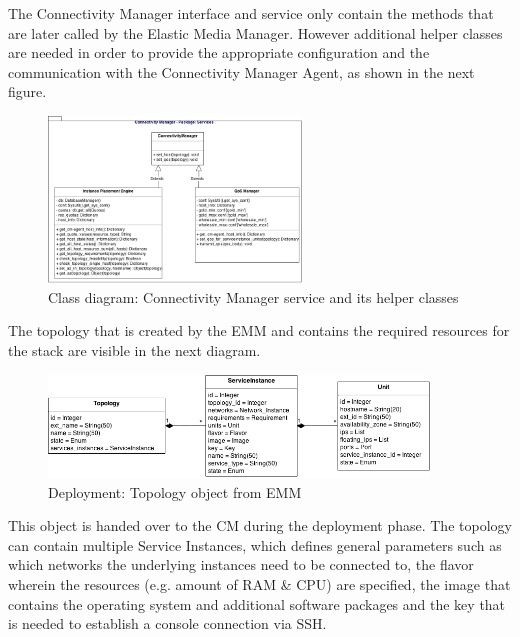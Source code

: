 The Connectivity Manager interface and service only contain the methods that are later called by the Elastic Media Manager. However additional helper classes are needed in order to provide the appropriate configuration and the communication with the Connectivity Manager Agent, as shown in the next figure.

\begin{figure}[H]
\centering

\includegraphics[width=0.6\textwidth]{images/design/cm_class_diagram}

\caption{Class diagram: Connectivity Manager service and its helper classes}
\end{figure}

The topology that is created by the EMM and contains the required resources for the stack are visible in the next diagram.

\begin{figure}[H]
\centering

\includegraphics[width=0.9\textwidth]{images/design/cm_topology_object}

\caption{Deployment: Topology object from EMM}
\end{figure}

This object is handed over to the CM during the deployment phase. The topology can contain multiple Service Instances, which defines general parameters such as which networks the underlying instances need to be connected to, the flavor wherein the resources (e.g. amount of RAM \& CPU) are specified, the image that contains the operating system and additional software packages and the key that is needed to establish a console connection via SSH.

